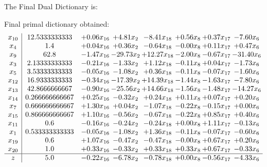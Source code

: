 \documentclass[8pt]{article}
\begin{document}
The Final Dual Dictionary is: 

 Final primal dictionary obtained: 
\[\begin{array}{c| c c@{\hskip 2pt} c@{\hskip 2pt} c@{\hskip 2pt} c@{\hskip 2pt} c@{\hskip 2pt} c@{\hskip 2pt} }
 x_{10}   &  12.5333333333 & +  0.06 x_{16} & +  4.81 x_{2} & -8.41 x_{18} & +  0.56 x_{8} & +  0.37 x_{17} & -7.60 x_{6}\\
 x_{4}   &  1.4 & +  0.04 x_{16} & +  0.36 x_{2} & -0.64 x_{18} & -0.00 x_{8} & +  0.11 x_{17} & +  0.47 x_{6}\\
 x_{9}   &  62.8 & -1.47 x_{16} & -29.73 x_{2} & + 12.27 x_{18} & -2.00 x_{8} & -0.67 x_{17} & -31.40 x_{6}\\
 x_{3}   &  2.13333333333 & -0.21 x_{16} & -1.33 x_{2} & +  1.12 x_{18} & -0.11 x_{8} & +  0.04 x_{17} & -1.73 x_{6}\\
 x_{5}   &  3.53333333333 & -0.05 x_{16} & -1.08 x_{2} & +  0.36 x_{18} & -0.11 x_{8} & -0.07 x_{17} & -1.60 x_{6}\\
 x_{12}   &  16.9333333333 & -0.34 x_{16} & -17.39 x_{2} & + 14.39 x_{18} & -1.44 x_{8} & -1.63 x_{17} & -7.80 x_{6}\\
 x_{13}   &  42.8666666667 & -0.90 x_{16} & -25.56 x_{2} & + 14.66 x_{18} & -1.56 x_{8} & -1.48 x_{17} & -14.27 x_{6}\\
 x_{14}   &  0.266666666667 & +  0.25 x_{16} & -0.32 x_{2} & +  0.24 x_{18} & +  0.11 x_{8} & +  0.07 x_{17} & +  0.20 x_{6}\\
 x_{7}   &  0.666666666667 & +  1.30 x_{16} & +  0.04 x_{2} & -1.07 x_{18} & -0.22 x_{8} & -0.15 x_{17} & +  0.00 x_{6}\\
 x_{15}   &  0.866666666667 & +  1.10 x_{16} & -0.56 x_{2} & -0.67 x_{18} & -0.22 x_{8} & +  0.85 x_{17} & +  0.40 x_{6}\\
 x_{11}   &  0.6 & -0.16 x_{16} & -0.24 x_{2} & -0.24 x_{18} & +  0.00 x_{8} & +  1.11 x_{17} & -0.13 x_{6}\\
 x_{1}   &  0.533333333333 & -0.05 x_{16} & -1.08 x_{2} & +  1.36 x_{18} & -0.11 x_{8} & -0.07 x_{17} & -0.60 x_{6}\\
 x_{19}   &  0.6 & +  1.07 x_{16} & -0.47 x_{2} & -0.47 x_{18} & -0.00 x_{8} & +  0.67 x_{17} & +  0.20 x_{6}\\
 x_{20}   &  1.0 & +  0.33 x_{16} & -0.33 x_{2} & +  0.33 x_{18} & +  0.33 x_{8} & +  0.67 x_{17} & -0.33 x_{6}\\
\hline
z    &  5.0 & -0.22 x_{16} & -6.78 x_{2} & -0.78 x_{18} & +  0.00 x_{8} & -0.56 x_{17} & -4.33 x_{6}\\
\end{array}\]
\end{document}
